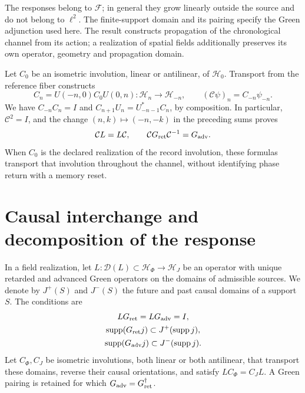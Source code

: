 The responses belong to \(\mathcal F\); in general they grow
linearly outside the source and do not belong to \(\ell^2\).
The finite-support domain and its pairing specify the Green adjunction
used here. The result constructs propagation of the chronological
channel from its action; a realization of spatial fields additionally preserves
its own operator, geometry and propagation domain.

Let \(C_0\) be an isometric involution, linear or antilinear, of
\(\mathcal H_0\). Transport from the reference fiber constructs
\[
 C_n=U(-n,0)C_0U(0,n):\mathcal H_n\longrightarrow\mathcal H_{-n},
 \qquad (\mathcal C\psi)_n=C_{-n}\psi_{-n}.
\]
We have \(C_{-n}C_n=I\) and
\(C_{n+1}U_n=U_{-n-1}^*C_n\), by composition.
In particular, \(\mathcal C^2=I\), and the change \((n,k)\mapsto(-n,-k)\)
in the preceding sums proves
\begin{equation}
 \mathcal C L=L\mathcal C,\qquad
 \mathcal C G_{\rm ret}\mathcal C^{-1}=G_{\rm adv}.
 \label{x_reciprocidad:vii:eq:intercambio-green-cronologico}
\end{equation}
When \(C_0\) is the declared realization of the record involution,
these formulas transport that involution throughout the channel, without identifying
phase return with a memory reset.

\section{Causal interchange and decomposition of the response}
\label{x_reciprocidad:vii:subsec:green-realizacion-campos}

In a field realization, let
\(L:\mathcal D(L)\subset\mathcal H_\Phi\to\mathcal H_J\)
be an operator with unique retarded and advanced Green operators on the domains of
admissible sources. We denote by \(J^+(S)\) and \(J^-(S)\) the
future and past causal domains of a support \(S\). The conditions are
\[
 \begin{gathered}
 LG_{\rm ret}=LG_{\rm adv}=I,\\
 \operatorname{supp}(G_{\rm ret}j)\subset J^+(\operatorname{supp}j),\\
 \operatorname{supp}(G_{\rm adv}j)\subset J^-(\operatorname{supp}j).
 \end{gathered}
\]
Let \(C_\Phi,C_J\) be isometric involutions, both linear or both
antilinear, that transport these domains,
reverse their causal orientations, and satisfy
\(LC_\Phi=C_JL\). A Green pairing is retained for which
\(G_{\rm adv}=G_{\rm ret}^{\dagger}\).

